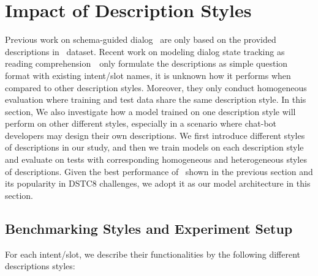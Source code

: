 \section{Impact of Description Styles}
\label{sec:sgd:abl-desc}
Previous work on schema-guided dialog~\cite{rastogi2020schema} are
only based on the provided descriptions in \sgdst~dataset. Recent work
on modeling dialog state tracking as reading
comprehension~\cite{gao2019dialog}~only formulate the descriptions as
simple question format with existing intent/slot names, it is unknown
how it performs when compared to other description styles. Moreover,
they only conduct homogeneous evaluation where training and test data
share the same description style. In this section, We also investigate
how a model trained on one description style will perform on other
different styles, especially in a scenario where chat-bot developers
may design their own descriptions. We first introduce different styles
of descriptions in our study, and then we train models on each
description style and evaluate on tests with corresponding homogeneous
and heterogeneous styles of descriptions. Given the best performance
of \CE~shown in the previous section and its popularity in DSTC8
challenges, we adopt it as our model architecture in this section.

\subsection{Benchmarking Styles and Experiment Setup}
\label{ssec:desc-styles}
For each intent/slot, we describe their functionalities by the
following different descriptions styles:

